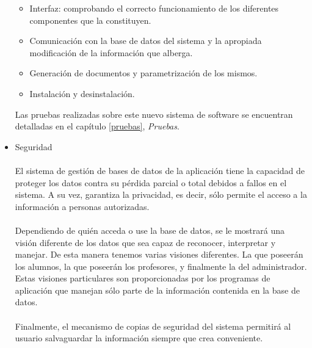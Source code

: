 \begin{itemize}
   \begin{itemize}
      \item Interfaz: comprobando el correcto funcionamiento de los diferentes
      componentes que la constituyen.
      \item Comunicación con la base de datos del sistema y la apropiada
      modificación de la información que alberga.
      \item Generación de documentos y parametrización de los mismos.
      \item Instalación y desinstalación.
   \end{itemize}

   Las pruebas realizadas sobre este nuevo sistema de software se
   encuentran detalladas en el capítulo \ref{pruebas}, \textit{Pruebas}.


 \item Seguridad

   \paragraph{}El sistema de gestión de bases de datos de la aplicación tiene la
   capacidad de proteger los datos contra su pérdida parcial o total debidos a
   fallos en el sistema. A su vez, garantiza la privacidad, es decir, sólo
   permite el acceso a la información a personas autorizadas.

   \paragraph{}Dependiendo de quién acceda o use la base de datos, se le
   mostrará una visión diferente de los datos que sea capaz de reconocer,
   interpretar y manejar. De esta manera tenemos varias visiones diferentes. La
   que poseerán los alumnos, la que poseerán los profesores, y finalmente la del
   administrador. Estas visiones   particulares son proporcionadas por los
   programas de aplicación que manejan sólo parte de la información contenida
   en la base de datos.


   \paragraph{}Finalmente, el mecanismo de copias de seguridad del sistema
   permitirá al usuario salvaguardar la información siempre que crea
   conveniente.

\end{itemize}
